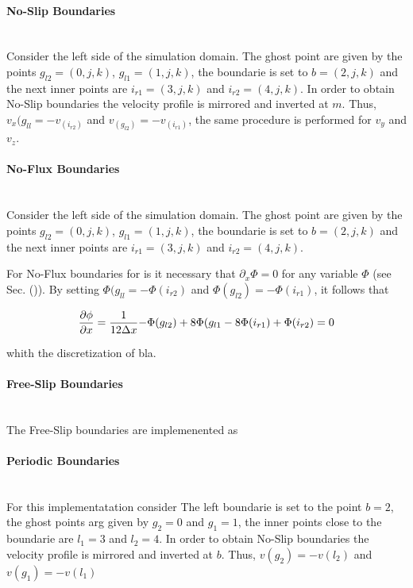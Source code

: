 \paragraph{No-Slip Boundaries}\mbox{}\\

Consider the left side of the simulation domain.
The ghost point are given by the points ${g_{l2}=(0, j, k)}$, ${g_{l1}=(1, j, k)}$,
the boundarie is set to  ${b=(2, j, k)}$ and the next inner points are
$i_{r1}=(3, j, k)$ and $i_{r2}=(4, j, k)$.
In order to obtain No-Slip boundaries the velocity profile is mirrored and inverted
at $m$. Thus, $v_x(g_{ll} = -v_(i_{r2})$ and  $v_(g_{l2}) = -v_(i_{r1})$, the same
procedure is performed for $v_y$ and $v_z$.

\paragraph{No-Flux Boundaries}\mbox{}\\

Consider the left side of the simulation domain.
The ghost point are given by the points ${g_{l2}=(0, j, k)}$, ${g_{l1}=(1, j, k)}$,
the boundarie is set to  ${b=(2, j, k)}$ and the next inner points are
$i_{r1}=(3, j, k)$ and $i_{r2}=(4, j, k)$.

For No-Flux boundaries for is it necessary that $\partial_x\Phi = 0$ for any variable $\Phi$ (see  Sec. ()).
By setting  $\Phi(g_{ll} = -\Phi(i_{r2})$ and  $\Phi(g_{l2}) = -\Phi(i_{r1})$, it follows that

\begin{align}
    \pdn[\phi]{x} = \frac{1}{12\Delta x}{-\Phi(g_{l2})+8\Phi(g_{l1} -8\Phi(i_{r1}) + \Phi(i_{r2})} = 0
\end{align}

whith the discretization of bla.

\paragraph{Free-Slip Boundaries}\mbox{}\\
The Free-Slip boundaries are implemenented as

\paragraph{Periodic Boundaries}\mbox{}\\
For this implementatation consider
The left boundarie is set to the point $b=2$,
the ghost points arg given by $g_2=0$ and $g_1=1$, the inner points close
to the boundarie are $l_1=3$ and $l_2=4$.
In order to obtain No-Slip boundaries the velocity profile is mirrored and inverted
at $b$. Thus, $v(g_2) = -v(l_2)$ and  $v(g_1) = -v(l_1)$

